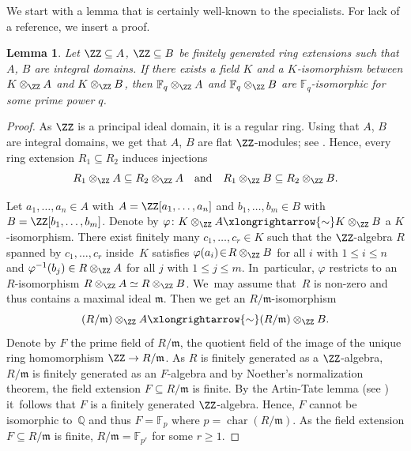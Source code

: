 \documentclass[JEP,XML,SOM,Unicode,NoFloatCountersInSection,published]{cedram}
\newcommand\quand{\quad\text{and}\quad}
\newtheorem{lemma}{Lemma}[section]
\theoremstyle{definition}
\newcommand\FF{{\mathbb F}}
\newcommand\QQ{{\mathbb Q}}
\newcommand\mm{{\mathfrak m}}
\DeclareMathOperator{\car}{char}
\begin{document}
We start with a lemma that is certainly well-known to the specialists. For lack of a reference, we insert a proof.

\begin{lemma}
\label{Lem:Induced_Isom}
Let $\ZZ \subseteq A$, $\ZZ \subseteq B$ be finitely generated ring extensions such that $A$, $B$
are integral domains.
If there exists a field $K$ and a $K$-isomorphism between $K \otimes_{\ZZ} A$ and $K \otimes_{\ZZ} B$, then
$\FF_{q} \otimes_{\ZZ} A$ and $\FF_{q} \otimes_{\ZZ} B$ are $\FF_{q}$-isomorphic
for some prime power $q$.
\end{lemma}

\begin{proof}
As $\ZZ$ is a principal ideal domain, it is a regular ring.
Using that $A$, $B$ are integral domains, we get that $A$, $B$ are flat $\ZZ$-modules; see \cite[Ch.\,III, Prop.\,9.7]{Ha1977Algebraic-geometry}. Hence, every ring extension $R_1 \subseteq R_2$
induces injections
\[
R_1 \otimes_{\ZZ} A \subseteq R_2 \otimes_{\ZZ} A \quand
R_1 \otimes_{\ZZ} B \subseteq R_2 \otimes_{\ZZ} B.
\]

Let $a_1, \ldots, a_n \in A$ with $A = \ZZ[a_1, \ldots, a_n]$ and
$b_1, \ldots, b_m \in B$ with $B = \ZZ[b_1, \ldots, b_m]$. Denote by
$\varphi \colon K \otimes_{\ZZ} A \xlongrightarrow{\sim} K \otimes_{\ZZ} B$ a $K$-isomorphism.
There exist
finitely many $c_1, \ldots, c_r \in K$ such that the $\ZZ$-algebra $R$ spanned by
$c_1, \ldots, c_r$ inside~$K$ satisfies $\varphi(a_i) \!\in\! R \otimes_{\ZZ} B$
for all $i$ with $1 \leq i \leq n$ and $\varphi^{-1}(b_j) \in R \otimes_{\ZZ} A$ for all $j$ with $1 \leq j \leq m$.
In~particular, $\varphi$ restricts to an $R$-isomorphism $R \otimes_{\ZZ} A \simeq R \otimes_{\ZZ} B$.
We~may assume that~$R$ is non-zero and thus contains a maximal ideal $\mm$. Then we get an $R/\mm$-isomorphism
\[
(R/\mm) \otimes_{\ZZ} A \xlongrightarrow{\sim} (R/\mm) \otimes_{\ZZ} B.
\]
Denote by $F$ the prime field of $R/\mm$, \ie the
quotient field of the image of the unique ring homomorphism $\ZZ \to R/\mm$.
As $R$ is finitely generated as a $\ZZ$-algebra,
$R/\mm$ is finitely generated as an $F$-algebra
and by Noether's normalization theorem, the field extension $F \subseteq R /\mm$ is finite. By
the Artin-Tate lemma (see \cite[Prop.\,7.8]{AtMa1969Introduction-to-co})
it~follows that $F$ is a finitely generated $\ZZ$-algebra. Hence, $F$ cannot be isomorphic to~$\QQ$
and thus $F = \FF_p$ where $p = \car(R/\mm)$. As the field extension $F \subseteq R/\mm$ is finite,
$R/\mm = \FF_{p^r}$ for some $r \geq 1$.
\end{proof}
\end{document}
